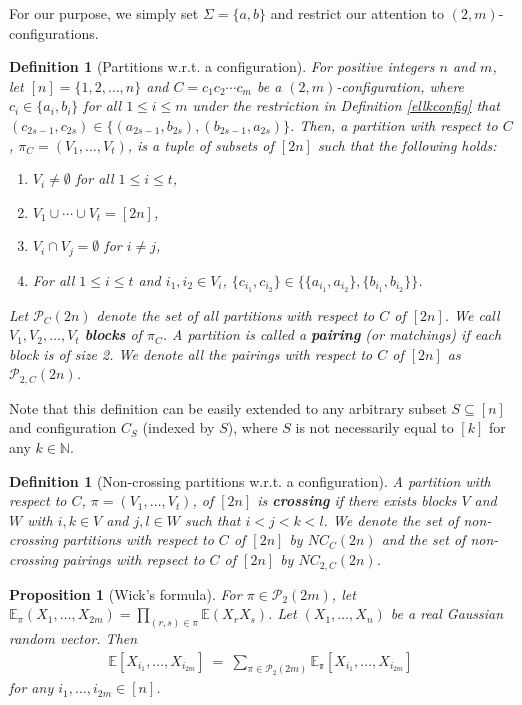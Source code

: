 \documentclass[11pt,reqno]{amsart}
\numberwithin{equation}{section}
\theoremstyle{plain}
\newtheorem{definition}[thm]{Definition}
\newtheorem{proposition}[thm]{Proposition}
\begin{document}
For our purpose, we simply set $\Sigma=\{a,b\}$ and restrict our attention to $(2,m)$-configurations.

\begin{definition}[Partitions w.r.t. a configuration]
For positive integers $n$ and $m$, let $[n]=\{1, 2, \dots, n\}$ and $C=c_1c_2\cdots c_m$ be a $(2,m)$-configuration, where $c_i\in\{a_i,b_i\}$ for all $1\leq i\leq m$ under the restriction in Definition \ref{ellkconfig} that $(c_{2s-1},c_{2s})\in\{(a_{2s-1},b_{2s}),(b_{2s-1},a_{2s})\}$. Then, a partition with respect to $C$, $\pi_C=(V_1,\dots, V_t)$, is a tuple of subsets of $[2n]$ such that the following holds: 
\begin{enumerate}
\item $V_i\neq\emptyset$ for all $1\leq i\leq t$,
\item $V_1\cup\cdots\cup V_t=[2n]$,
\item $V_i\cap V_j=\emptyset$ for $i\neq j$,
\item For all $1\leq i\leq t$ and $i_1,i_2\in V_i$, $\{c_{i_1},c_{i_2}\}\in\{\{a_{i_1},a_{i_2}\},\{b_{i_1},b_{i_2}\}\}$.
\end{enumerate}
Let $\mathcal{P}_C(2n)$ denote the set of all partitions with respect to $C$ of $[2n]$. We call $V_1, V_2, \dots, V_t$ \textbf{blocks} of $\pi_C$. A partition is called a \textbf{pairing} (or matchings) if each block is of size 2. We denote all the pairings with respect to $C$ of $[2n]$ as $\mathcal{P}_{2,C}(2n)$.
\end{definition}

Note that this definition can be easily extended to any arbitrary subset $S\subseteq [n]$ and configuration $C_S$ (indexed by $S$), where $S$ is not necessarily equal to $[k]$ for any $k\in \mathbb{N}$.

\begin{definition}[Non-crossing partitions w.r.t. a configuration]
A partition with respect to $C$, $\pi=(V_1,\dots, V_t)$, of $[2n]$ is \textbf{crossing} if there exists blocks $V$ and $W$ with $i, k\in V$ and $j, l\in W$ such that $i<j<k<l$. We denote the set of non-crossing partitions with respect to $C$ of $[2n]$ by $NC_C(2n)$ and the set of non-crossing pairings with repsect to $C$ of $[2n]$ by $NC_{2,C}(2n)$.
\end{definition}



\begin{proposition}[Wick's formula] For $\pi\in\mathcal{P}_2(2m)$, let $\mathbb{E}_\pi(X_1,\dots, X_{2m})=\prod_{(r,s)\in\pi}\mathbb{E}(X_rX_s)$. Let $(X_1, \dots, X_n)$ be a real Gaussian random vector. Then
\begin{align}
\mathbb{E}[X_{i_1}, \dots, X_{i_{2m}}] \ = \ \sum_{\pi\in \mathcal{P}_2(2m)}\mathbb{E_\pi}[X_{i_1},\dots, X_{i_{2m}}]
\end{align}
for any $i_1,\dots, i_{2m}\in [n]$.
\end{proposition}
\end{document}
